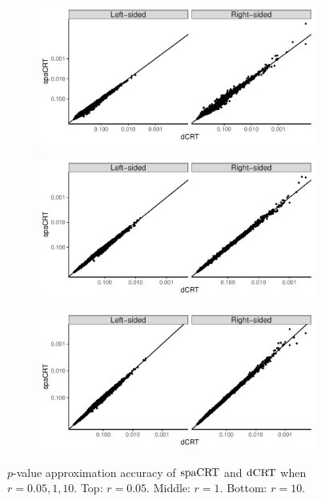 \documentclass[12pt]{article}
\theoremstyle{definition}
\newcommand{\dCRT}{\textnormal{dCRT}} 					%
\newcommand{\spacrt}{\textnormal{spaCRT}}               %
\begin{document}
  \begin{figure}[!ht]
	\centering
	\begin{subfigure}{\textwidth}
		\centering
		\includegraphics[width=.95\textwidth]{figures-and-tables/simulation/NB-regression/QQ/disp-0.05-dCRT-spaCRT.pdf}
	\end{subfigure}

	\begin{subfigure}{\textwidth}
		\centering
		\includegraphics[width=.95\textwidth]{figures-and-tables/simulation/NB-regression/QQ/disp-1-dCRT-spaCRT.pdf}
	\end{subfigure}

	\begin{subfigure}{\textwidth}
		\centering
		\includegraphics[width=.95\textwidth]{figures-and-tables/simulation/NB-regression/QQ/disp-10-dCRT-spaCRT.pdf}
	\end{subfigure}

    \caption{$p$-value approximation accuracy of $\spacrt$ and $\dCRT$ when $r=0.05, 1, 10$. Top: $r=0.05$. Middle: $r=1$. Bottom: $r=10$.}
    \label{fig:simulation-CRISPR-screens-approximation-accuracy}
  \end{figure}
\end{document}
